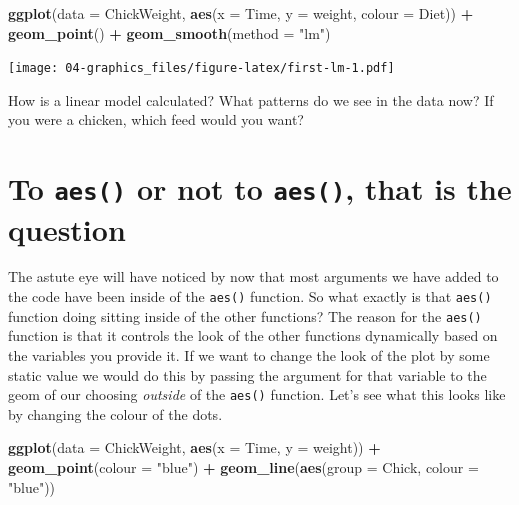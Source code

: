\documentclass[]{book}
\newenvironment{Shaded}{\begin{snugshade}}{\end{snugshade}}
\newcommand{\KeywordTok}[1]{\textcolor[rgb]{0.13,0.29,0.53}{\textbf{#1}}}
\newcommand{\DataTypeTok}[1]{\textcolor[rgb]{0.13,0.29,0.53}{#1}}
\newcommand{\StringTok}[1]{\textcolor[rgb]{0.31,0.60,0.02}{#1}}
\newcommand{\OperatorTok}[1]{\textcolor[rgb]{0.81,0.36,0.00}{\textbf{#1}}}
\newcommand{\NormalTok}[1]{#1}
\theoremstyle{definition}
\theoremstyle{definition}
\theoremstyle{definition}
\theoremstyle{remark}
\begin{document}
\begin{Shaded}
\begin{Highlighting}[]
\KeywordTok{ggplot}\NormalTok{(}\DataTypeTok{data =}\NormalTok{ ChickWeight, }\KeywordTok{aes}\NormalTok{(}\DataTypeTok{x =}\NormalTok{ Time, }\DataTypeTok{y =}\NormalTok{ weight, }\DataTypeTok{colour =}\NormalTok{ Diet)) }\OperatorTok{+}
\StringTok{  }\KeywordTok{geom_point}\NormalTok{() }\OperatorTok{+}
\StringTok{  }\KeywordTok{geom_smooth}\NormalTok{(}\DataTypeTok{method =} \StringTok{"lm"}\NormalTok{)}
\end{Highlighting}
\end{Shaded}

\texttt{[image: 04-graphics\_files/figure-latex/first-lm-1.pdf]}

How is a linear model calculated? What patterns do we see in the data
now? If you were a chicken, which feed would you want?

\section{\texorpdfstring{To \texttt{aes()} or not to \texttt{aes()},
that is the
question}{To aes() or not to aes(), that is the question}}\label{to-aes-or-not-to-aes-that-is-the-question}

The astute eye will have noticed by now that most arguments we have
added to the code have been inside of the \texttt{aes()} function. So
what exactly is that \texttt{aes()} function doing sitting inside of the
other functions? The reason for the \texttt{aes()} function is that it
controls the look of the other functions dynamically based on the
variables you provide it. If we want to change the look of the plot by
some static value we would do this by passing the argument for that
variable to the geom of our choosing \emph{outside} of the
\texttt{aes()} function. Let's see what this looks like by changing the
colour of the dots.

\begin{Shaded}
\begin{Highlighting}[]
\KeywordTok{ggplot}\NormalTok{(}\DataTypeTok{data =}\NormalTok{ ChickWeight, }\KeywordTok{aes}\NormalTok{(}\DataTypeTok{x =}\NormalTok{ Time, }\DataTypeTok{y =}\NormalTok{ weight)) }\OperatorTok{+}
\StringTok{  }\KeywordTok{geom_point}\NormalTok{(}\DataTypeTok{colour =} \StringTok{"blue"}\NormalTok{) }\OperatorTok{+}
\StringTok{  }\KeywordTok{geom_line}\NormalTok{(}\KeywordTok{aes}\NormalTok{(}\DataTypeTok{group =}\NormalTok{ Chick, }\DataTypeTok{colour =} \StringTok{"blue"}\NormalTok{))}
\end{Highlighting}
\end{Shaded}
\end{document}
